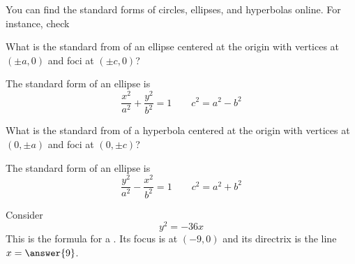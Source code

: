 \documentclass{ximera}
\begin{document}
You can find the standard forms of circles, ellipses, and hyperbolas online. For instance, check 

\begin{problem}
  What is the standard from of an ellipse centered at the origin with
  vertices at $(\pm a,0)$ and foci at $(\pm c ,0)$?
  \begin{explanation}
    The standard form of an ellipse is
    \[
    \frac{x^2}{a^2} + \frac{y^2}{b^2}=1\qquad c^2 = a^2 - b^2
    \]
  \end{explanation}
\end{problem}



\begin{problem}
  What is the standard from of a hyperbola centered at the origin with
  vertices at $(0,\pm a)$ and foci at $(0,\pm c)$?
  \begin{explanation}
    The standard form of an ellipse is
    \[
    \frac{y^2}{a^2} - \frac{x^2}{b^2}=1\qquad c^2 = a^2 + b^2
    \]
  \end{explanation}
\end{problem}


\begin{problem}
  Consider
  \[
  y^2 = -36x
  \]
  This is the formula for a
  .
  Its focus is at $\left(-9,0\right)$ and its directrix is the line $x
  = \answer{9}$. 
\end{problem}
\end{document}
